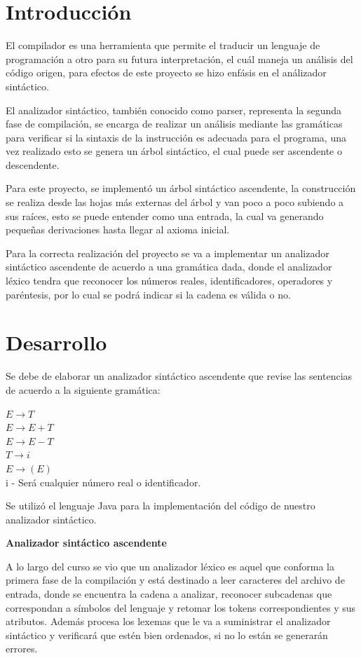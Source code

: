 \documentclass[letterpaper]{article}
\begin{document}
\tableofcontents

\newpage

\section{Introducción}
El compilador es una herramienta que permite el traducir un lenguaje de programación a otro
para su futura interpretación, el cuál maneja un análisis del código origen, para efectos de este
proyecto se hizo enfásis en el análizador sintáctico.

El analizador sintáctico, también conocido como parser, representa la segunda
fase de compilación, se encarga de realizar un análisis mediante las
gramáticas para verificar si la sintaxis de la instrucción es adecuada para el programa, una
vez realizado esto se genera un árbol sintáctico, el cual puede ser ascendente o descendente. 

Para este proyecto, se implementó un árbol sintáctico ascendente, la construcción se
realiza desde las hojas más externas del árbol y van poco a poco subiendo a sus raíces, esto
se puede entender como una entrada, la cual va generando pequeñas derivaciones hasta
llegar al axioma inicial.

Para la correcta realización del proyecto se va a implementar un analizador sintáctico
ascendente de acuerdo a una gramática dada, donde el analizador léxico tendra que reconocer
los números reales, identificadores, operadores y paréntesis, por lo cual se podrá indicar
si la cadena es válida o no.


\section{Desarrollo}
Se debe de elaborar un analizador sintáctico ascendente que revise las sentencias
de acuerdo a la siguiente gramática:

$E \rightarrow T$ \\
$E \rightarrow E + T$ \\
$E \rightarrow E - T$ \\
$T \rightarrow i$ \\
$E \rightarrow (E)$ \\
i - Será cualquier número real o identificador.

Se utilizó el lenguaje Java para la implementación del código de nuestro analizador sintáctico.

\textbf{Analizador sintáctico ascendente}

A lo largo del curso se vio que un analizador léxico es aquel que conforma la primera fase
de la compilación  y está destinado a leer caracteres del archivo de entrada, donde se
encuentra la cadena a analizar, reconocer subcadenas que correspondan a símbolos del lenguaje
y retomar los tokens correspondientes y sus atributos. Además procesa los lexemas que le va a 
suministrar el analizador sintáctico y verificará que estén bien ordenados, si no lo están
se generarán errores.
\end{document}
